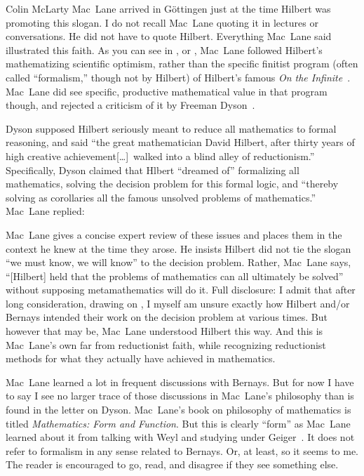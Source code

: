 \begin{artengenv}{Colin McLarty}
Mac~Lane arrived in G\"ottingen just at the time Hilbert was promoting this slogan.  I do not recall Mac~Lane quoting it in lectures or conversations.  He did not have to quote Hilbert.  Everything Mac~Lane said illustrated this faith.  As you can see in \textcite{MFF,MacLAuto}, or \textcite{McLSaundersLast}, Mac~Lane followed Hilbert's mathematizing scientific optimism, rather than the specific finitist program (often called ``formalism,'' though not by Hilbert) of Hilbert's famous \textit{On the Infinite}~\parencite*{HilbUnend}.  Mac~Lane did see specific, productive mathematical value in that program though, and rejected a criticism of it by Freeman Dyson~\parencite{MacLDyson}.

Dyson supposed Hilbert seriously meant to reduce all mathematics to formal reasoning, and said ``the great mathematician David Hilbert, after thirty years of high creative achievement[\dots]\ walked into a blind alley of reductionism.''  Specifically, Dyson claimed that Hlbert ``dreamed of'' formalizing all mathematics, solving the decision problem for this formal logic, and ``thereby solving as corollaries all the famous unsolved problems of mathematics.''  Mac~Lane replied:

Mac~Lane gives a concise expert review of these issues and places them in the context he knew at the time they arose.  He insists Hilbert did not tie the slogan ``we must know, we will know'' to the decision problem.  Rather, Mac~Lane says, ``[Hilbert] held that the problems of mathematics can all ultimately be solved'' without supposing metamathematics will do it. Full disclosure: I admit that after long consideration, drawing on \textcite{SiegProg,SiegBook}, I myself am unsure exactly how Hilbert and/or Bernays intended their work on the decision problem at various times. But however that may be, Mac~Lane understood Hilbert this way.  And this is Mac~Lane's own far from reductionist faith, while recognizing reductionist methods for what they actually have achieved in mathematics.

Mac~Lane learned a lot in frequent discussions with Bernays.  But for now I have to say I see no larger trace of those discussions in Mac~Lane's philosophy than is found in the letter on Dyson.  Mac~Lane's book on philosophy of mathematics is titled \textit{Mathematics: Form and Function}.  But this is clearly ``form'' as Mac~Lane learned about it from talking with Weyl and studying under Geiger~\parencite{McLSaundersLast}. It does not refer to formalism in any sense related to Bernays.  Or, at least, so it seems to me.  The reader is encouraged to go, read, and disagree if they see something else.




\end{artengenv}
